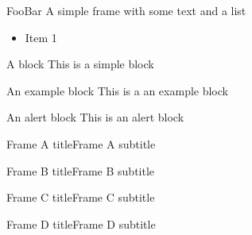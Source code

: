 





\begin{frame}[plain]
	\titlepage{}
\end{frame}

\begin{frame}{Foo}{Bar}
    A simple frame with some text and a list

    \begin{itemize}
        \item Item 1\footnotemark
    \end{itemize}

    \begin{block}{A block}
        This is a simple block
    \end{block}

    \begin{exampleblock}{An example block}
        This is a an example block
    \end{exampleblock}

    \begin{alertblock}{An alert block}
        This is an alert block
    \end{alertblock}

\end{frame}

\begin{frameA}{Frame A title}{Frame A subtitle}
\end{frameA}

\begin{frameB}{Frame B title}{Frame B subtitle}
\end{frameB}

\begin{frameC}{Frame C title}{Frame C subtitle}
\end{frameC}

\begin{frameD}{Frame D title}{Frame D subtitle}
\end{frameD}


